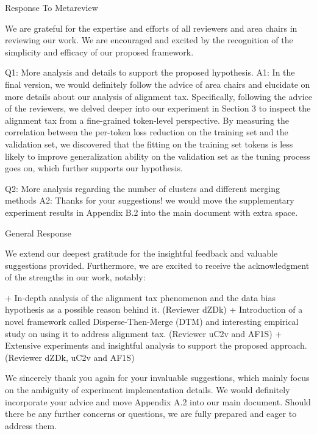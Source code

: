 Response To Metareview

We are grateful for the expertise and efforts of all reviewers and area chairs in reviewing our work. We are encouraged and excited by the recognition of the simplicity and efficacy of our proposed framework.

Q1: More analysis and details to support the proposed hypothesis.
A1: In the final version, we would definitely follow the advice of area chairs and elucidate on more details about our analysis of alignment tax. Specifically, following the advice of the reviewers, we delved deeper into our experiment in Section 3 to inspect the alignment tax from a fine-grained token-level perspective. By measuring the correlation between the per-token loss reduction on the training set and the validation set, we discovered that the fitting on the training set tokens is less likely to improve generalization ability on the validation set as the tuning process goes on, which further supports our hypothesis. 


Q2: More analysis regarding the number of clusters and different merging methods
A2: Thanks for your suggestions!  we would move the supplementary experiment results in Appendix B.2 into the main document with extra space.







General Response

We extend our deepest gratitude for the insightful feedback and valuable suggestions provided. Furthermore, we are excited to receive the acknowledgment of the strengths in our work, notably:

+ In-depth analysis of the alignment tax phenomenon and the data bias hypothesis as a possible reason behind it. (Reviewer dZDk)
+ Introduction of a novel framework called Disperse-Then-Merge (DTM) and interesting empirical study on using it to address alignment tax. (Reviewer uC2v and AF1S)
+ Extensive experiments and insightful analysis to support the proposed approach. (Reviewer dZDk, uC2v and AF1S)

We sincerely thank you again for your invaluable suggestions, which mainly focus on the ambiguity of experiment implementation details. We would definitely incorporate your advice and move Appendix A.2 into our main document. Should there be any further concerns or questions, we are fully prepared and eager to address them.






